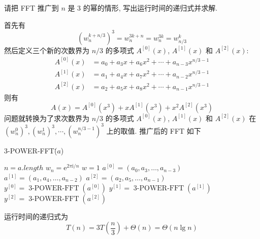 \documentclass[boxes]{homework}
\begin{document}
\begin{problem}
请把 FFT 推广到 $n$ 是 3 的幂的情形, 写出运行时间的递归式并求解.
\end{problem}
\begin{solution}
    首先有
    \begin{equation}
        {\left( w_{n}^{k + n / 3}\right)}^{3} = w_{n}^{3k + n} = w_{n}^{3k} =
        w_{n / 3}^{k}
    \end{equation}
    然后定义三个新的次数界为 $n / 3$ 的多项式 $A^{[0]}(x)$, $A^{[1]}(x)$ 和
    $A^{[2]}(x)$:
    \begin{equation}
        \begin{aligned}
            A^{[0]}(x) & = a_{0} + a_{3} x + a_{6} x^{2} + \cdots +
            a_{n - 3} x^{n / 3 - 1}                                 \\
            A^{[1]}(x) & = a_{1} + a_{4} x + a_{7} x^{2} + \cdots +
            a_{n - 2} x^{n / 3 - 1}                                 \\
            A^{[2]}(x) & = a_{2} + a_{5} x + a_{8} x^{2} + \cdots +
            a_{n - 1} x^{n / 3 - 1}
        \end{aligned}
    \end{equation}
    则有
    \begin{equation}
        A(x) = A^{[0]} \left( x^{3}\right) + xA^{[1]} \left( x^{3}\right) +
        x^{2}A^{[2]} \left( x^{3}\right)
    \end{equation}
    问题就转换为了求次数界为 $n / 3$ 的多项式 $A^{[0]}(x)$, $A^{[1]}(x)$ 和
    $A^{[2]}(x)$ 在 ${\left( w_{n}^{0}\right)}^{3},
        {\left( w_{n}^{1}\right)}^{3}, \cdots,
        {\left( w_{n}^{n / 3 - 1}\right)}^{3}$ 上的取值. 推广后的 FFT 如下
    \begin{algo}
        \caption{3-POWER-FFT\.($a$)}

        $n = a.length$\;
        $w_{n} = \mathrm{e}^{2\pi \mathrm{i} / n}$\;
        $w = 1$\;
        $a^{[0]} = \left( a_{0}, a_{3}, \ldots, a_{n - 3} \right)$\;
        $a^{[1]} = \left( a_{1}, a_{4}, \ldots, a_{n - 2} \right)$\;
        $a^{[2]} = \left( a_{2}, a_{5}, \ldots, a_{n - 1} \right)$\;
        $y^{[0]} = \operatorname{3-POWER-FFT} \left( a^{[0]}\right)$\;
        $y^{[1]} = \operatorname{3-POWER-FFT} \left( a^{[1]}\right)$\;
        $y^{[2]} = \operatorname{3-POWER-FFT} \left( a^{[2]}\right)$\;
        \;
    \end{algo}
    运行时间的递归式为
    \begin{equation}
        T(n) = 3 T \left( \frac{ n }{ 3 }\right) + \Theta(n) = \Theta(n \lg n)
    \end{equation}
\end{solution}
\end{document}
